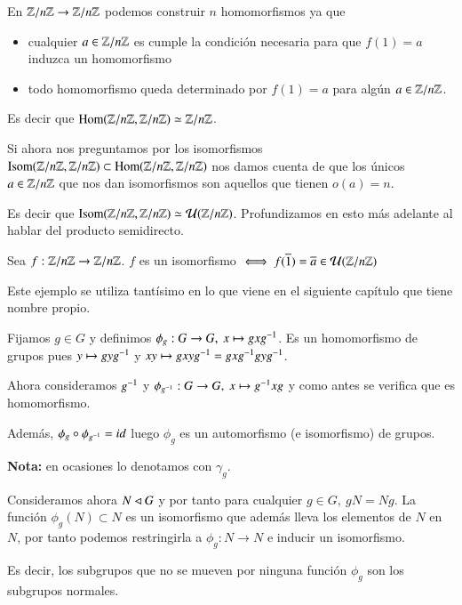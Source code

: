 \begin{ej}
	En $\mathbb{Z}/n\mathbb{Z} \to \mathbb{Z}/n\mathbb{Z}$ podemos construir $n$ homomorfismos ya que
	\begin{itemize}
		\item cualquier $a \in \mathbb{Z}/n\mathbb{Z}$ es cumple la condición necesaria para que $f(1) = a$ induzca un homomorfismo
		\item todo homomorfismo queda determinado por $f(1) = a$ para algún $a \in \mathbb{Z}/n\mathbb{Z}$.
	\end{itemize}
	
	Es decir que $\text{Hom}(\mathbb{Z}/n\mathbb{Z}, \mathbb{Z}/n\mathbb{Z}) \simeq \mathbb{Z}/n\mathbb{Z}$.
\end{ej}

\begin{ej}
	Si ahora nos preguntamos por los isomorfismos $\text{Isom}(\mathbb{Z}/n\mathbb{Z}, \mathbb{Z}/n\mathbb{Z}) \subset \text{Hom}(\mathbb{Z}/n\mathbb{Z}, \mathbb{Z}/n\mathbb{Z})$ nos damos cuenta de que los únicos $a \in \mathbb{Z}/n\mathbb{Z}$ que nos dan isomorfismos son aquellos que tienen $o(a) = n$.
	
	Es decir que $\text{Isom}(\mathbb{Z}/n\mathbb{Z}, \mathbb{Z}/n\mathbb{Z}) \simeq \mathcal{U}(\mathbb{Z}/n\mathbb{Z})$. Profundizamos en esto más adelante al hablar del producto semidirecto.
\end{ej}


\begin{pro}[O ejemplo]
	Sea $f: \mathbb{Z}/n\mathbb{Z} \to \mathbb{Z}/n\mathbb{Z}$. $f$ es un isomorfismo $\iff f(\overline{1}) = \overline{a} \in \mathcal{U}(\mathbb{Z}/n\mathbb{Z})$
\end{pro}

\begin{ej}
	Este ejemplo se utiliza tantísimo en lo que viene en el siguiente capítulo que tiene nombre propio.
	
	Fijamos $g \in G$ y definimos $\phi_g:G \to G,\ x \mapsto gxg^{-1}$. Es un homomorfismo de grupos pues $y\mapsto gyg^{-1}$ y $xy \mapsto gxyg^{-1} = gxg^{-1}gyg^{-1}$.
	
	Ahora consideramos $g^{-1}$ y $\phi_{g^{-1}}: G \to G,\ x \mapsto g^{-1}xg$ y como antes se verifica que es homomorfismo.
	
	Además, $\phi_g \circ \phi_{g^{-1}} = id$ luego $\phi_g$ es un automorfismo (e isomorfismo) de grupos.
	
	\textbf{Nota:} en ocasiones lo denotamos con $\gamma_g$.
\end{ej}


\begin{ej}
	Consideramos ahora $N \lhd G$ y por tanto para cualquier $g \in G,\ gN = Ng$. La función $\phi_g(N) \subset N$ es un isomorfismo que además lleva los elementos de $N$ en $N$, por tanto podemos restringirla a $\phi_g:N \to N$ e inducir un isomorfismo.
	
	Es decir, los subgrupos que no se mueven por ninguna función $\phi_g$ son los subgrupos normales.
\end{ej}


